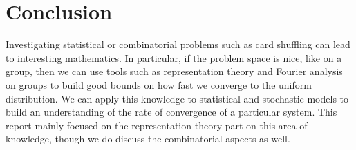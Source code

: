 \documentclass[]{article}
\theoremstyle{definition}
\numberwithin{theorem}{section}
\numberwithin{equation}{section}
\begin{document}
\section{Conclusion}
Investigating statistical or combinatorial problems such as card shuffling can lead to interesting mathematics. In particular, if the problem space is nice, like on a group, then we can use tools such as representation theory and Fourier analysis on groups to build good bounds on how fast we converge to the uniform distribution. We can apply this knowledge to statistical and stochastic models to build an understanding of the rate of convergence of a particular system. This report mainly focused on the representation theory part on this area of knowledge, though we do discuss the combinatorial aspects as well. 
\printbibliography
\end{document}
